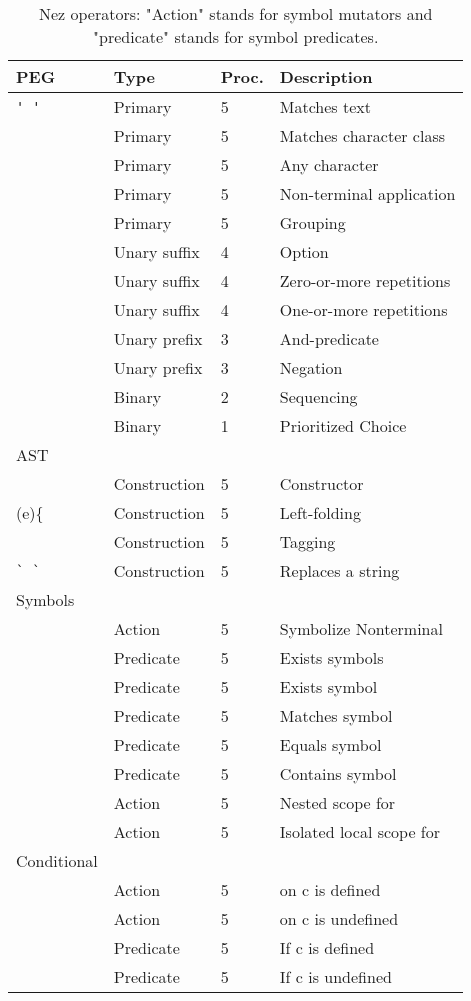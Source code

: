 \documentclass[preprint]{sigplanconf}
\begin{document}
\begin{table}[bt]
\begin{center}
\begin{tabular}{llll} \hline
PEG  & Type & Proc. & Description\\ \hline
\verb|' '| & Primary & 5 & Matches text\\
 & Primary & 5 & Matches character class \\
 & Primary & 5 & Any character\\
 & Primary & 5 & Non-terminal application\\
 & Primary & 5 & Grouping\\
 & Unary suffix & 4 & Option\\
 & Unary suffix & 4 & Zero-or-more repetitions\\
 & Unary suffix & 4 & One-or-more repetitions\\
 & Unary prefix & 3 & And-predicate\\
 & Unary prefix & 3 & Negation\\
 & Binary & 2 & Sequencing\\
 & Binary & 1 & Prioritized Choice\\ \hline

AST  &  &  & \\ \hline

 & Construction & 5 & Constructor\\
(e)\{\ & Construction & 5 & Left-folding\\ 
 & Construction & 5 & Tagging \\
\verb|` `| & Construction & 5 & Replaces a string \\ \hline

Symbols  &  &  & \\ \hline

 & Action & 5 & Symbolize Nonterminal  \\ 
 & Predicate & 5 & Exists symbols \\ 
 & Predicate & 5 & Exists  symbol \\ 
 & Predicate & 5 & Matches symbol \\ 
 & Predicate & 5 & Equals symbol \\ 
 & Predicate & 5 & Contains symbol \\ 
 & Action & 5 & Nested scope for  \\ 
 & Action & 5 & Isolated local scope for  \\ \hline 

Conditional  &  &  & \\ \hline

 & Action & 5 &  on c is defined \\ 
 & Action & 5 &  on c is undefined \\ 
 & Predicate & 5 & If c is defined  \\ 
 & Predicate & 5 & If c is undefined  \\ \hline
\end{tabular}

\caption{Nez operators: "Action" stands for symbol mutators and "predicate" stands for symbol predicates. } 
\label{table:nez}

\end{center}
\end{table}
\end{document}
